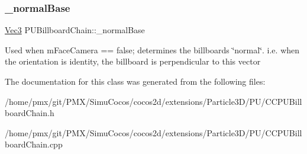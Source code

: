 \subsubsection{\texorpdfstring{\+\_\+normal\+Base}{\_normalBase}}
{\footnotesize\ttfamily \hyperlink{classVec3}{Vec3} P\+U\+Billboard\+Chain\+::\+\_\+normal\+Base\hspace{0.3cm}{\ttfamily [protected]}}

Used when m\+Face\+Camera == false; determines the billboard\textquotesingle{}s \char`\"{}normal\char`\"{}. i.\+e. when the orientation is identity, the billboard is perpendicular to this vector 

The documentation for this class was generated from the following files\+:\begin{DoxyCompactItemize}
\item 
/home/pmx/git/\+P\+M\+X/\+Simu\+Cocos/cocos2d/extensions/\+Particle3\+D/\+P\+U/C\+C\+P\+U\+Billboard\+Chain.\+h\item 
/home/pmx/git/\+P\+M\+X/\+Simu\+Cocos/cocos2d/extensions/\+Particle3\+D/\+P\+U/C\+C\+P\+U\+Billboard\+Chain.\+cpp\end{DoxyCompactItemize}
